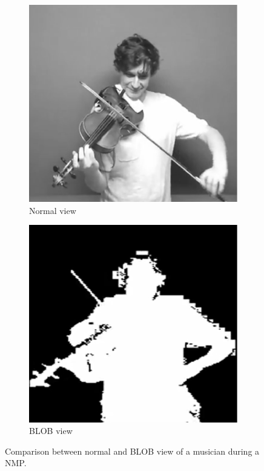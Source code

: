 \begin{figure}[t]
	\centering
	\begin{subfigure}[t]{.46\columnwidth}
		\centering        
		\includegraphics[trim={0cm 0cm 0cm 0cm},clip,width=\textwidth]{img/webcam}
		\caption{Normal view}
		\label{subfig:webcam}
	\end{subfigure}
	\quad
	\begin{subfigure}[t]{.46\columnwidth}
		\centering        
		\includegraphics[trim={0cm 0cm 0cm 0cm},clip,width=\textwidth]{img/blob}
		\caption{BLOB view}
		\label{subfig:blob}
	\end{subfigure}
	\quad 
	\caption{Comparison between normal and BLOB view of a musician during a NMP.}\label{fig:wb}
\end{figure}  


